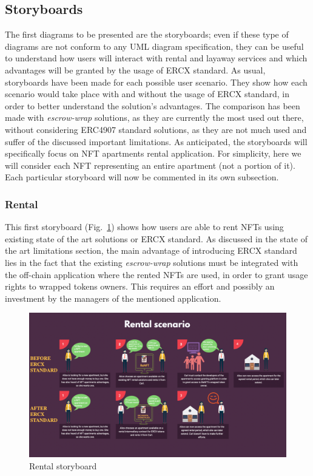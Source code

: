\documentclass[english, LaM, oneside]{sapthesis}%
\begin{document}
\subsection{Storyboards}
The first diagrams to be presented are the storyboards; even if these type of diagrams are not conform to any UML diagram specification, they can be useful to understand how users will interact with rental and layaway services and which advantages will be granted by the usage of ERCX standard. As usual, storyboards have been made for each possible user scenario. They show how each scenario would take place with and without the usage of ERCX standard, in order to better understand the solution's advantages. The comparison has been made with \textit{escrow-wrap} solutions, as they are currently the most used out there, without considering ERC4907 standard solutions, as they are not much used and suffer of the discussed important limitations.\newline
As anticipated, the storyboards will specifically focus on NFT apartments rental application. For simplicity, here we will consider each NFT representing an entire apartment (not a portion of it). Each particular storyboard will now be commented in its own subsection.

\subsubsection{Rental}
This first storyboard (Fig.~\ref{fig:Rental SB}) shows how users are able to rent NFTs using existing state of the art solutions or ERCX standard. As discussed in the state of the art limitations section, the main advantage of introducing ERCX standard lies in the fact that the existing \textit{escrow-wrap} solutions must be integrated with the off-chain application where the rented NFTs are used, in order to grant usage rights to wrapped tokens owners. This requires an effort and possibly an investment by the managers of the mentioned application.

\begin{figure}
    \centering
        \begin{adjustbox}{width=1\textwidth}
            \includegraphics{storyboards/rental.pdf}
        \end{adjustbox}
    \caption{Rental storyboard}
    \label{fig:Rental SB}
\end{figure}
\end{document}
